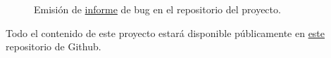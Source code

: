 \begin{figure}[H]
    \caption{Emisión de \href{https://github.com/Olasergiolas/TFG/issues/11}{informe} de bug en el repositorio del proyecto.}
    \label{fig:issue}
\end{figure}

Todo el contenido de este proyecto estará disponible públicamente en \href{https://github.com/Olasergiolas/TFG}{este} repositorio de Github. 